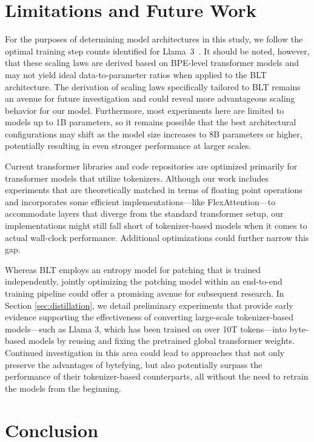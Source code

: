 \section{Limitations and Future Work}

For the purposes of determining model architectures in this study, we follow the optimal training step counts identified for Llama~3~\citep{dubey2024llama}. It should be noted, however, that these scaling laws are derived based on BPE-level transformer models and may not yield ideal data-to-parameter ratios when applied to the {\textsc BLT} architecture. The derivation of scaling laws specifically tailored to {\textsc BLT} remains an avenue for future investigation and could reveal more advantageous scaling behavior for our model. Furthermore, most experiments here are limited to models up to 1B parameters, so it remains possible that the best architectural configurations may shift as the model size increases to 8B parameters or higher, potentially resulting in even stronger performance at larger scales.

Current transformer libraries and code repositories are optimized primarily for transformer models that utilize tokenizers. Although our work includes experiments that are theoretically matched in terms of floating point operations and incorporates some efficient implementations—like FlexAttention—to accommodate layers that diverge from the standard transformer setup, our implementations might still fall short of tokenizer-based models when it comes to actual wall-clock performance. Additional optimizations could further narrow this gap.

Whereas {\textsc BLT} employs an entropy model for patching that is trained independently, jointly optimizing the patching model within an end-to-end training pipeline could offer a promising avenue for subsequent research. In Section \ref{sec:distillation}, we detail preliminary experiments that provide early evidence supporting the effectiveness of converting large-scale tokenizer-based models—such as Llama 3, which has been trained on over 10T tokens—into byte-based models by reusing and fixing the pretrained global transformer weights. Continued investigation in this area could lead to approaches that not only preserve the advantages of bytefying, but also potentially surpass the performance of their tokenizer-based counterparts, all without the need to retrain the models from the beginning.

\section{Conclusion}
\label{section:conclusion}

